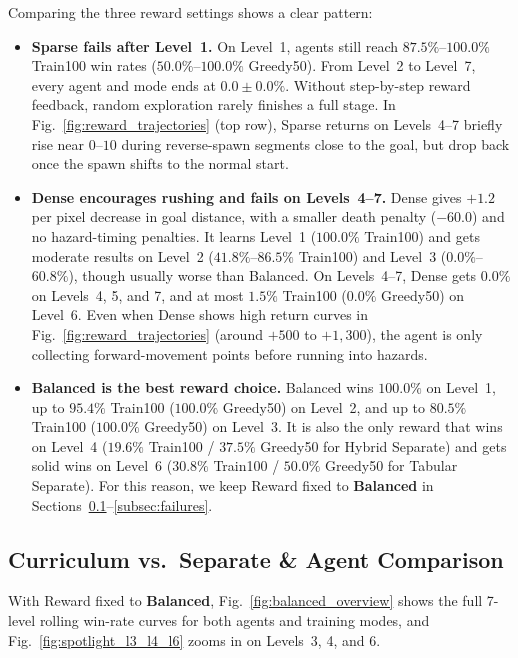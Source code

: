 Comparing the three reward settings shows a clear pattern:
\begin{itemize}
    \item \textbf{Sparse fails after Level~1.} On Level~1, agents still reach $87.5\%$--$100.0\%$ Train100 win rates ($50.0\%$--$100.0\%$ Greedy50). From Level~2 to Level~7, every agent and mode ends at $0.0 \pm 0.0\%$. Without step-by-step reward feedback, random exploration rarely finishes a full stage. In Fig.~\ref{fig:reward_trajectories} (top row), Sparse returns on Levels~4--7 briefly rise near $0$--$10$ during reverse-spawn segments close to the goal, but drop back once the spawn shifts to the normal start.
    \item \textbf{Dense encourages rushing and fails on Levels~4--7.} Dense gives $+1.2$ per pixel decrease in goal distance, with a smaller death penalty ($-60.0$) and no hazard-timing penalties. It learns Level~1 ($100.0\%$ Train100) and gets moderate results on Level~2 ($41.8\%$--$86.5\%$ Train100) and Level~3 ($0.0\%$--$60.8\%$), though usually worse than Balanced. On Levels~4--7, Dense gets $0.0\%$ on Levels~4, 5, and 7, and at most $1.5\%$ Train100 ($0.0\%$ Greedy50) on Level~6. Even when Dense shows high return curves in Fig.~\ref{fig:reward_trajectories} (around $+500$ to $+1{,}300$), the agent is only collecting forward-movement points before running into hazards.
    \item \textbf{Balanced is the best reward choice.} Balanced wins $100.0\%$ on Level~1, up to $95.4\%$ Train100 ($100.0\%$ Greedy50) on Level~2, and up to $80.5\%$ Train100 ($100.0\%$ Greedy50) on Level~3. It is also the only reward that wins on Level~4 ($19.6\%$ Train100 / $37.5\%$ Greedy50 for Hybrid Separate) and gets solid wins on Level~6 ($30.8\%$ Train100 / $50.0\%$ Greedy50 for Tabular Separate). For this reason, we keep Reward fixed to \textbf{Balanced} in Sections~\ref{subsec:curr_vs_sep}--\ref{subsec:failures}.
\end{itemize}

\subsection{Curriculum vs.\ Separate \& Agent Comparison}
\label{subsec:curr_vs_sep}

With Reward fixed to \textbf{Balanced}, Fig.~\ref{fig:balanced_overview} shows the full 7-level rolling win-rate curves for both agents and training modes, and Fig.~\ref{fig:spotlight_l3_l4_l6} zooms in on Levels~3, 4, and 6.

